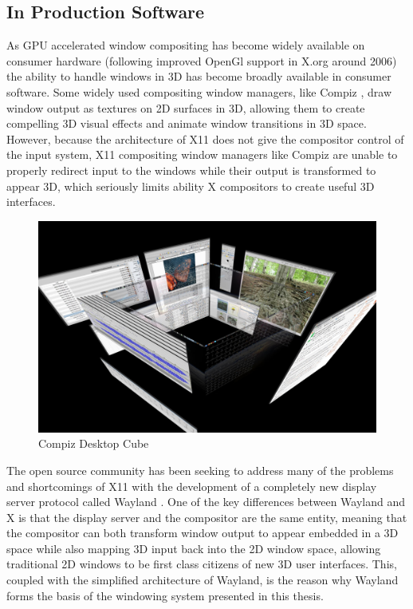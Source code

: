 \subsection{In Production Software}

As GPU accelerated window compositing has become widely available on consumer hardware (following improved OpenGl support in X.org around 2006) the ability to handle windows in 3D has become broadly available in consumer software.  Some widely used compositing window managers, like Compiz \cite{compiz}, draw window output as textures on 2D surfaces in 3D, allowing them to create compelling 3D visual effects and animate window transitions in 3D space. However, because the architecture of X11 does not give the compositor control of the input system, X11 compositing window managers like Compiz are unable to properly redirect input to the windows while their output is transformed to appear 3D, which seriously limits ability X compositors to create useful 3D interfaces.

\begin{figure}[ht!]
\centering
\includegraphics[width=1.0\textwidth]{images/compiz.jpg}
\caption{Compiz Desktop Cube \protect\cite{compiz}}
\end{figure}

The open source community has been seeking to address many of the problems and shortcomings of X11 with the development of a completely new display server protocol called Wayland \cite{wayland}. One of the key differences between Wayland and X is that the display server and the compositor are the same entity, meaning that the compositor can both transform window output to appear embedded in a 3D space while also mapping 3D input back into the 2D window space, allowing traditional 2D windows to be first class citizens of new 3D user interfaces. This, coupled with the simplified architecture of Wayland, is the reason why Wayland forms the basis of the windowing system presented in this thesis.

